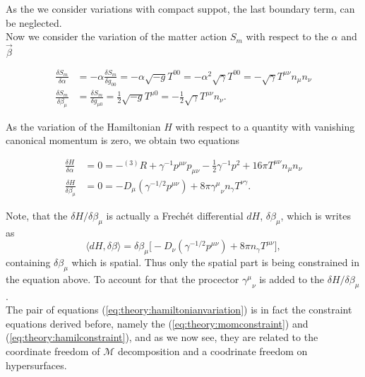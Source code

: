 \documentclass[11pt,a4paper,headinclude=true,DIV=14,BCOR=8mm,chapterprefix,listof=totoc,twoside,openright,abstracton]{scrbook}
\begin{document}
As the we consider variations with compact suppot, the last boundary term, can be neglected. \\

Now we consider the variation of the matter action $S_m$ with respect to the $\alpha$ and $\vec{\beta}$

\begin{align}
    \frac{\delta S_m}{\delta \alpha} &=-\alpha\frac{\delta S_m}{\delta g_{00}} = -\alpha\sqrt{-g}T^{00} = -\alpha^2\sqrt{\gamma}T^{00} = -\sqrt{\gamma}T^{\mu\nu}n_{\mu}n_{\nu} \\
    \frac{\delta S_m}{\delta \beta_{\mu}} &= \frac{\delta S_m}{\delta g_{\mu 0}} =\frac{1}{2}\sqrt{-g}T^{\mu 0} = -\frac{1}{2} \sqrt{\gamma}T^{\mu\nu}n_{\nu}.
\end{align}

As the variation of the Hamiltonian $H$ with respect to a quantity with vanishing canonical momentum is zero, we obtain two equations 

\begin{align}
    \frac{\delta H}{\delta \alpha} &= 0 = -{^{(3)}R} + \gamma^{-1}p^{\mu\nu}p_{\mu\nu}-\frac{1}{2}\gamma^{-1}p^2 + 16\pi T^{\mu\nu}n_{\mu}n_{\nu} \\
    \frac{\delta H}{\delta \beta_{\mu}} &= 0 = - D_{\mu}(\gamma^{-1/2}p^{\mu\nu}) + 8\pi{\gamma^{\mu}}_{\nu}n_{\gamma}T^{\nu\gamma}.
    \label{eq:theory:hamiltonianvariation}
\end{align}


Note, that the $\delta H / \delta\beta_{\mu}$ is actually a Frech\'et differential $dH$, $\delta \beta_{\mu}$, which is writes as
\begin{equation}
    \langle dH,\delta\beta \rangle = \delta\beta_{\mu}\big[-D_{\nu}(\gamma^{-1/2}p^{\mu\nu})+8\pi n_{\gamma}T^{\mu\nu}\big], 
\end{equation}
containing $\delta\beta_{\mu}$ which is spatial. Thus only the spatial part is being constrained in the equation above. To account for that the procector ${\gamma^{\mu}}_{\nu}$ is added to the $\delta H/\delta \beta_{\mu}$. \\

The pair of equations (\ref{eq:theory:hamiltonianvariation}) is in fact the constraint equations derived before, namely the (\ref{eq:theory:momconstraint}) and (\ref{eq:theory:hamilconstraint}), and as we now see, they are related to the coordinate freedom of $\mathcal{M}$ decomposition and a coodrinate freedom on hypersurfaces. \\
\end{document}
